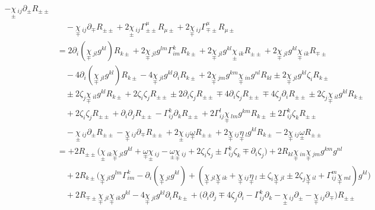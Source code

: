 \documentclass[a4paper,11pt]{article}
\begin{document}
\begin{align*}
    -\underset{\pm}{\chi}\,_{ij} \partial_\pm R_{\pm\pm}\\
    & \quad
    -\underset{\mp}{\chi}\,_{ij} \partial_\mp R_{\pm\pm}
    + 2 \underset{\pm}{\chi}\,_{ij} \Gamma_{\pm\pm}^\mu R_{\mu\pm}
    + 2 \underset{\mp}{\chi}\,_{ij} \Gamma_{\mp\pm}^\mu R_{\mu\pm}\\
    &= 2 \partial_i(\underset{\mp}{\chi}\,_{jl}g^{kl}) R_{k\pm}
    + 2 \underset{\mp}{\chi}\,_{jl}g^{lm} \Gamma_{im}^k R_{k\pm}
    + 2 \underset{\mp}{\chi}\,_{jl}g^{kl} \underset{\pm}{\chi}\,_{ik} R_{\pm\pm}
    + 2 \underset{\mp}{\chi}\,_{jl}g^{kl} \underset{\mp}{\chi}\,_{ik} R_{\mp\pm}\\
    &\quad
    - 4 \partial_i(\underset{\mp}{\chi}\,_{jl}g^{kl})  R_{k \pm}
    - 4 \underset{\mp}{\chi}\,_{jl}g^{kl}  \partial_i R_{k \pm}
    + 2 \underset{\mp}{\chi}\,_{jm}g^{km} \underset{\mp}{\chi}\,_{in}g^{nl} R_{kl}
    \pm 2 \underset{\mp}{\chi}\,_{jl}g^{kl} \zeta_i R_{k\pm}\\
    & \quad
    \pm 2 \zeta_j \underset{\mp}{\chi}\,_{il}g^{kl} R_{k\pm}
    + 2 \zeta_i \zeta_j R_{\pm\pm}
    \pm 2 \partial_i \zeta_j R_{\pm\pm}
    \mp 4 \partial_i\zeta_j R_{\pm\pm}
    \mp 4 \zeta_j \partial_i R_{\pm\pm}
    \pm 2 \zeta_j \underset{\mp}{\chi}\,_{il}g^{kl} R_{k\pm}\\
    & \quad
    + 2 \zeta_i \zeta_j R_{\pm\pm}
    + \partial_i \partial_j R_{\pm\pm}
    -\Gamma_{ij}^k \partial_k R_{\pm\pm}
    + 2 \Gamma_{ij}^l \underset{\mp}{\chi}\,_{lm}g^{km} R_{k\pm}
    \pm 2 \Gamma_{ij}^k \zeta_k R_{\pm\pm}\\
    &\quad 
    -\underset{\pm}{\chi}\,_{ij} \partial_\pm R_{\pm\pm}
    -\underset{\mp}{\chi}\,_{ij} \partial_\mp R_{\pm\pm}
    + 2 \underset{\pm}{\chi}\,_{ij} \underset{\mp}{\omega} R_{\pm\pm}
    + 2 \underset{\mp}{\chi}\,_{ij} \underset{\mp}{\eta}\,_l g^{kl} R_{k\pm}
    - 2 \underset{\mp}{\chi}\,_{ij} \underset{\pm}{\omega} R_{\pm\pm}\\
    &= 
    + 2 R_{\pm\pm} \Big( \underset{\pm}{\chi}\,_{ik} \underset{\mp}{\chi}\,_{jl}g^{kl}
    + \underset{\mp}{\omega} \underset{\pm}{\chi}\,_{ij}
    - \underset{\pm}{\omega} \underset{\mp}{\chi}\,_{ij}
    + 2 \zeta_i \zeta_j
    \pm \Gamma_{ij}^k \zeta_k 
    \mp \partial_i\zeta_j\Big)
    + 2 R_{kl} \underset{\mp}{\chi}\,_{in} \underset{\mp}{\chi}\,_{jm}g^{km}g^{nl}\\
    &\quad 
    + 2 R_{k\pm} \Big( \underset{\mp}{\chi}\,_{jl}g^{lm} \Gamma_{im}^k
    - \partial_i(\underset{\mp}{\chi}\,_{jl}g^{kl})
    + (\underset{\mp}{\chi}\,_{jl} \underset{\mp}{\chi}\,_{ik}
    + \underset{\mp}{\chi}\,_{ij} \underset{\mp}{\eta}\,_l
    \pm \zeta_i \underset{\mp}{\chi}\,_{jl}
    \pm 2 \zeta_j \underset{\mp}{\chi}\,_{il}
    + \Gamma_{ij}^m \underset{\mp}{\chi}\,_{ml} )g^{kl}\Big) \\
    &\quad 
    + 2 R_{\mp\pm} \underset{\mp}{\chi}\,_{jl} \underset{\mp}{\chi}\,_{ik} g^{kl}
    - 4 \underset{\mp}{\chi}\,_{jl}g^{kl}  \partial_i R_{k \pm}
    + \Big( \partial_i \partial_j
    \mp 4 \zeta_j \partial_i
    -\Gamma_{ij}^k \partial_k
    -\underset{\pm}{\chi}\,_{ij} \partial_\pm
    -\underset{\mp}{\chi}\,_{ij} \partial_\mp \Big) R_{\pm\pm}
\end{align*}
\end{document}
